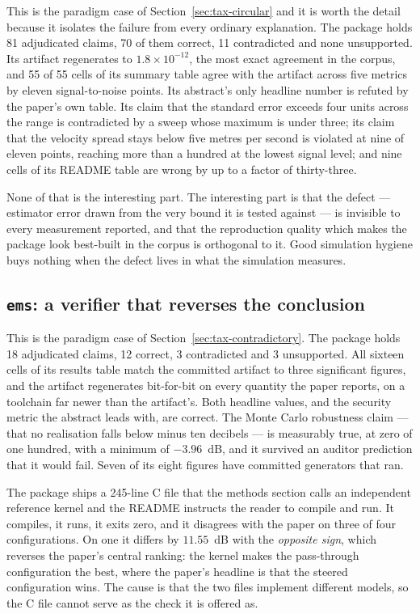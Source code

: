 \documentclass[sigconf,review]{acmart}
\newcommand{\pkg}[1]{\texttt{#1}}
\begin{document}
This is the paradigm case of Section~\ref{sec:tax-circular} and it is worth
the detail because it isolates the failure from every ordinary explanation.
The package holds 81 adjudicated claims, 70 of them correct, 11 contradicted
and none unsupported. Its artifact regenerates to $1.8\times10^{-12}$, the
most exact agreement in the corpus, and 55 of 55 cells of its summary table
agree with the artifact across five metrics by eleven signal-to-noise points.
Its abstract's only headline number is refuted by the paper's own table. Its
claim that the standard error exceeds four units across the range is
contradicted by a sweep whose maximum is under three; its claim that the
velocity spread stays below five metres per second is violated at nine of
eleven points, reaching more than a hundred at the lowest signal level; and
nine cells of its README table are wrong by up to a factor of thirty-three.

None of that is the interesting part. The interesting part is that the
defect --- estimator error drawn from the very bound it is tested against ---
is invisible to every measurement reported, and that the reproduction quality
which makes the package look best-built in the corpus is orthogonal to it.
Good simulation hygiene buys nothing when the defect lives in what the
simulation measures.

\subsection{\pkg{ems}: a verifier that reverses the conclusion}
\label{sec:case-ems}

This is the paradigm case of Section~\ref{sec:tax-contradictory}. The package
holds 18 adjudicated claims, 12 correct, 3 contradicted and 3 unsupported. All
sixteen cells of its results table match the committed artifact to three
significant figures, and the artifact regenerates bit-for-bit on every
quantity the paper reports, on a toolchain far newer than the artifact's.
Both headline values, and the security metric the abstract leads with, are
correct. The Monte Carlo robustness claim --- that no realisation falls below
minus ten decibels --- is measurably true, at zero of one hundred, with a
minimum of $-3.96$~dB, and it survived an auditor prediction that it would
fail. Seven of its eight figures have committed generators that ran.

The package ships a 245-line C file that the methods section calls an
independent reference kernel and the README instructs the reader to compile
and run. It compiles, it runs, it exits zero, and it disagrees with the paper
on three of four configurations. On one it differs by $11.55$~dB with the
\emph{opposite sign}, which reverses the paper's central ranking: the kernel
makes the pass-through configuration the best, where the paper's headline is
that the steered configuration wins. The cause is that the two files implement
different models, so the C file cannot serve as the check it is offered as.
\end{document}
